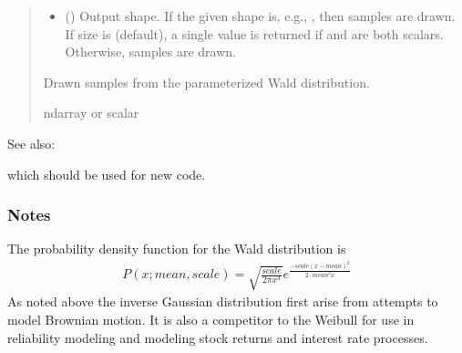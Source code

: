 \documentclass[letterpaper,10pt,english]{sphinxmanual}
\begin{document}
\begin{fulllineitems}
\begin{quote}
\begin{description}
\begin{itemize}
\item {} 
\sphinxAtStartPar
{} (\sphinxstyleliteralemphasis{\sphinxupquote{, }}) \textendash{} Output shape.  If the given shape is, e.g., , then
 samples are drawn.  If size is  (default),
a single value is returned if  and  are both scalars.
Otherwise,  samples are drawn.

\end{itemize}

\sphinxAtStartPar
{} \textendash{} Drawn samples from the parameterized Wald distribution.

\sphinxAtStartPar
ndarray or scalar

\end{description}\end{quote}


\begin{sphinxseealso}{See also:}
\begin{description}
\sphinxAtStartPar
which should be used for new code.

\end{description}


\end{sphinxseealso}

\subsubsection*{Notes}

\sphinxAtStartPar
The probability density function for the Wald distribution is
\begin{equation*}
\begin{split}P(x;mean,scale) = \sqrt{\frac{scale}{2\pi x^3}}e^
\frac{-scale(x-mean)^2}{2\cdotp mean^2x}\end{split}
\end{equation*}
\sphinxAtStartPar
As noted above the inverse Gaussian distribution first arise
from attempts to model Brownian motion. It is also a
competitor to the Weibull for use in reliability modeling and
modeling stock returns and interest rate processes.

\end{fulllineitems}
\end{document}
